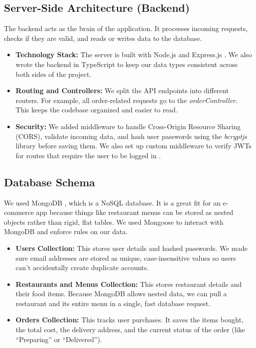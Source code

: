 \documentclass[conference]{IEEEtran}
\begin{document}
\subsection{Server-Side Architecture (Backend)}
The backend acts as the brain of the application. It processes incoming requests, checks if they are valid, and reads or writes data to the database.

\begin{itemize}
\item \textbf{Technology Stack:} The server is built with Node.js \cite{b1} and Express.js \cite{b4}. We also wrote the backend in TypeScript to keep our data types consistent across both sides of the project.
\item \textbf{Routing and Controllers:} We split the API endpoints into different routers. For example, all order-related requests go to the \textit{orderController}. This keeps the codebase organized and easier to read.
\item \textbf{Security:} We added middleware to handle Cross-Origin Resource Sharing (CORS), validate incoming data, and hash user passwords using the \textit{bcryptjs} library before saving them. We also set up custom middleware to verify JWTs for routes that require the user to be logged in \cite{b7}.
\end{itemize}

\subsection{Database Schema}
We used MongoDB \cite{b3}, which is a NoSQL database. It is a great fit for an e-commerce app because things like restaurant menus can be stored as nested objects rather than rigid, flat tables. We used Mongoose to interact with MongoDB and enforce rules on our data.

\begin{itemize}
\item \textbf{Users Collection:} This stores user details and hashed passwords. We made sure email addresses are stored as unique, case-insensitive values so users can't accidentally create duplicate accounts.
\item \textbf{Restaurants and Menus Collection:} This stores restaurant details and their food items. Because MongoDB allows nested data, we can pull a restaurant and its entire menu in a single, fast database request.
\item \textbf{Orders Collection:} This tracks user purchases. It saves the items bought, the total cost, the delivery address, and the current status of the order (like ``Preparing'' or ``Delivered'').
\end{itemize}
\end{document}
